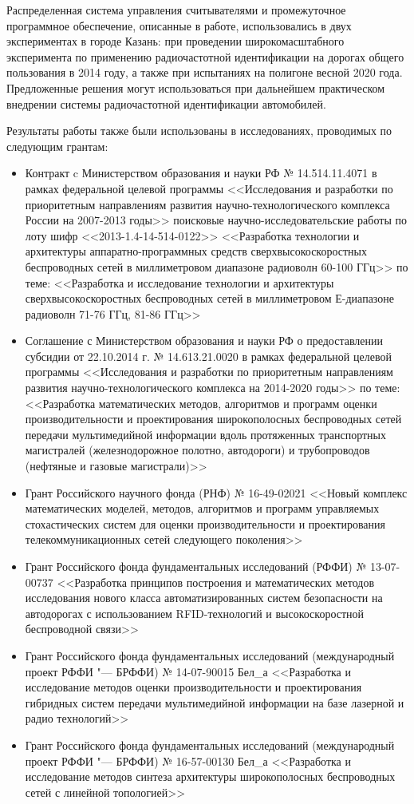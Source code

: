 Распределенная система управления считывателями и промежуточное программное обеспечение, описанные в работе, использовались в двух экспериментах в городе Казань: при проведении широкомасштабного эксперимента по применению радиочастотной идентификации на дорогах общего пользования в 2014 году, а также при испытаниях на полигоне весной 2020 года. Предложенные решения могут использоваться при дальнейшем практическом внедрении системы радиочастотной идентификации автомобилей.

Результаты работы также были использованы в исследованиях, проводимых по следующим грантам:

\begin{itemize}
	\item Контракт c Министерством образования и науки РФ № 14.514.11.4071 в рамках федеральной целевой программы <<Исследования и разработки по приоритетным направлениям развития научно-технологического комплекса России на 2007-2013 годы>> поисковые научно-исследовательские работы по лоту шифр <<2013-1.4-14-514-0122>> <<Разработка технологии и архитектуры аппаратно-программных средств сверхвысокоскоростных беспроводных сетей в миллиметровом диапазоне радиоволн 60-100 ГГц>> по теме: <<Разработка и исследование технологии и архитектуры сверхвысокоскоростных беспроводных сетей в миллиметровом Е-диапазоне радиоволн 71-76 ГГц, 81-86 ГГц>>
	\item Соглашение с Министерством образования и науки РФ о предоставлении субсидии от 22.10.2014 г. № 14.613.21.0020 в рамках федеральной целевой программы <<Исследования и разработки по приоритетным направлениям развития научно-технологического комплекса на 2014-2020 годы>> по теме: <<Разработка математических методов, алгоритмов и программ оценки производительности и проектирования широкополосных беспроводных сетей передачи мультимедийной информации вдоль протяженных транспортных магистралей (железнодорожное полотно, автодороги) и трубопроводов (нефтяные и газовые магистрали)>>
	\item Грант Российского научного фонда (РНФ) № 16-49-02021 <<Новый комплекс математических моделей, методов, алгоритмов и программ управляемых стохастических систем для оценки производительности и проектирования телекоммуникационных сетей следующего поколения>>
	\item Грант Российского фонда фундаментальных исследований (РФФИ) № 13-07-00737 <<Разработка принципов построения и математических методов исследования нового класса автоматизированных систем безопасности на автодорогах с использованием RFID-технологий и высокоскоростной беспроводной связи>> 
	\item Грант Российского фонда фундаментальных исследований (международный проект РФФИ "--- БРФФИ) № 14-07-90015 Бел\_а <<Разработка и исследование методов оценки производительности и проектирования гибридных систем передачи мультимедийной информации на базе лазерной и радио технологий>>
	\item Грант Российского фонда фундаментальных исследований (международный проект РФФИ "--- БРФФИ) № 16-57-00130 Бел\_а <<Разработка и исследование методов синтеза архитектуры широкополосных беспроводных сетей с линейной топологией>>
\end{itemize}


